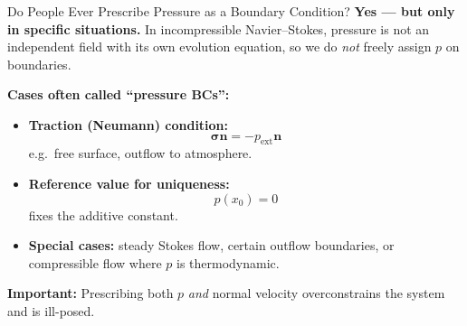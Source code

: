 \documentclass[aspectratio=169]{beamer}
\begin{document}
\begin{frame}{Do People Ever Prescribe Pressure as a Boundary Condition?}
\footnotesize
\textbf{Yes — but only in specific situations.}  
In incompressible Navier--Stokes, pressure is not an independent field with its own
evolution equation, so we do \emph{not} freely assign $p$ on boundaries.

\medskip

\textbf{Cases often called ``pressure BCs'':}
\begin{itemize}
  \item \textbf{Traction (Neumann) condition:}
        \[
        \boldsymbol{\sigma}\mathbf{n} = -p_{\text{ext}}\mathbf{n}
        \]
        e.g.\ free surface, outflow to atmosphere.
  \item \textbf{Reference value for uniqueness:}
        \[
        p(x_0)=0
        \]
        fixes the additive constant.
  \item \textbf{Special cases:}
        steady Stokes flow, certain outflow boundaries,
        or compressible flow where $p$ is thermodynamic.
\end{itemize}

\medskip

\textbf{Important:}  
Prescribing both $p$ \emph{and} normal velocity overconstrains the system and is ill-posed.

\end{frame}
\end{document}
